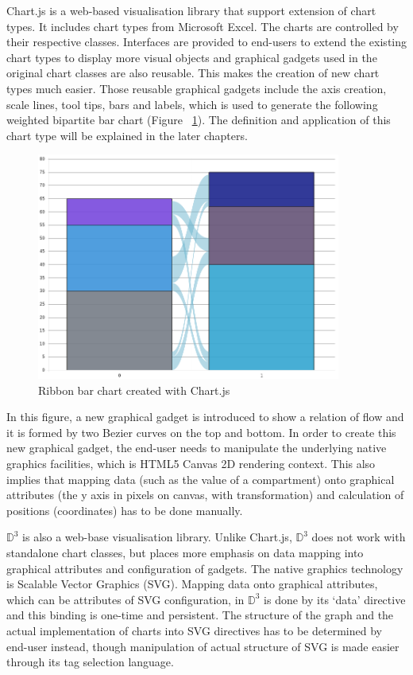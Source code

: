 \documentclass[11pt, a4paper]{report}
\begin{document}
Chart.js is a web-based visualisation library that support extension of chart types. It includes chart types from Microsoft Excel. The charts are controlled by their respective classes. Interfaces are provided to end-users to extend the existing chart types to display more visual objects and graphical gadgets used in the original chart classes are also reusable. This makes the creation of new chart types much easier. Those reusable graphical gadgets include the axis creation, scale lines, tool tips, bars and labels, which is used to generate the following weighted bipartite bar chart (Figure ~\ref{fig:ribbon_bar_chartjs}). The definition and application of this chart type will be explained in the later chapters.
\begin{figure}[H]
\centering
\includegraphics[width=10cm]{fig2_ribbon_bar_chartjs}
\caption{Ribbon bar chart created with Chart.js}
\label{fig:ribbon_bar_chartjs}
\end{figure}
In this figure, a new graphical gadget is introduced to show a relation of flow and it is formed by two Bezier curves on the top and bottom. In order to create this new graphical gadget, the end-user needs to manipulate the underlying native graphics facilities, which is HTML5 Canvas 2D rendering context. This also implies that mapping data (such as the value of a compartment) onto graphical attributes (the y axis in pixels on canvas, with transformation) and calculation of positions (coordinates) has to be done manually.

$\mathbb D^3$ is also a web-base visualisation library. Unlike Chart.js, $\mathbb D^3$ does not work with standalone chart classes, but places more emphasis on data mapping into graphical attributes and configuration of gadgets. The native graphics technology is Scalable Vector Graphics (SVG). Mapping data onto graphical attributes, which can be attributes of SVG configuration, in $\mathbb D^3$ is done by its `data' directive and this binding is one-time and persistent. The structure of the graph and the actual implementation of charts into SVG directives has to be determined by end-user instead, though manipulation of actual structure of SVG is made easier through its tag selection language.
\end{document}
